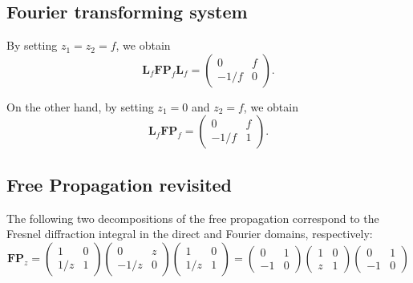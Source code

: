 \documentclass[a4paper,10pt]{report}
\begin{document}
\subsection{Fourier transforming system}
By setting $z_1 = z_2 = f$, we obtain
\begin{equation}
    \mathbf{L}_f \mathbf{FP}_f \mathbf{L}_f = \begin{pmatrix}
        0 & f \\
        -1/f & 0
    \end{pmatrix} .
\end{equation}

On the other hand, by setting $z_1 = 0$ and $z_2 = f$, we obtain
\begin{equation}
    \mathbf{L}_f \mathbf{FP}_f = \begin{pmatrix}
        0 & f \\
        -1/f & 1
    \end{pmatrix} .
\end{equation}

\subsection{Free Propagation revisited}

The following two decompositions of the free propagation correspond to the Fresnel diffraction integral in the direct and Fourier domains, respectively:
\begin{equation}
    \mathbf{FP}_z = \begin{pmatrix}
        1 & 0 \\
        1/z & 1
    \end{pmatrix} \begin{pmatrix}
        0 & z \\
        -1/z & 0
    \end{pmatrix} \begin{pmatrix}
        1 & 0 \\
        1/z & 1
    \end{pmatrix} = \begin{pmatrix}
        0 & 1 \\
        -1 & 0
    \end{pmatrix} \begin{pmatrix}
        1 & 0 \\
        z & 1
    \end{pmatrix} \begin{pmatrix}
        0 & 1 \\
        -1 & 0
    \end{pmatrix}
\end{equation}
\end{document}

